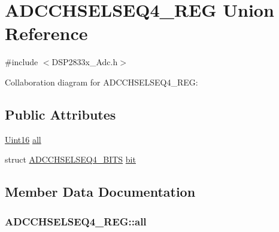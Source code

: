 \hypertarget{union_a_d_c_c_h_s_e_l_s_e_q4___r_e_g}{}\section{A\+D\+C\+C\+H\+S\+E\+L\+S\+E\+Q4\+\_\+\+R\+E\+G Union Reference}
\label{union_a_d_c_c_h_s_e_l_s_e_q4___r_e_g}


{\ttfamily \#include $<$D\+S\+P2833x\+\_\+\+Adc.\+h$>$}



Collaboration diagram for A\+D\+C\+C\+H\+S\+E\+L\+S\+E\+Q4\+\_\+\+R\+E\+G\+:
\subsection*{Public Attributes}
\begin{DoxyCompactItemize}
\item 
\hyperlink{_d_s_p2833x___device_8h_a59a9f6be4562c327cbfb4f7e8e18f08b}{Uint16} \hyperlink{union_a_d_c_c_h_s_e_l_s_e_q4___r_e_g_a1863a872aef8b5331636cfff9b10e40a}{all}
\item 
struct \hyperlink{struct_a_d_c_c_h_s_e_l_s_e_q4___b_i_t_s}{A\+D\+C\+C\+H\+S\+E\+L\+S\+E\+Q4\+\_\+\+B\+I\+T\+S} \hyperlink{union_a_d_c_c_h_s_e_l_s_e_q4___r_e_g_a3c932b9c01c8c20d08e05a337ecf8a9f}{bit}
\end{DoxyCompactItemize}


\subsection{Member Data Documentation}
\hypertarget{union_a_d_c_c_h_s_e_l_s_e_q4___r_e_g_a1863a872aef8b5331636cfff9b10e40a}{}
\subsubsection[{all}]{ A\+D\+C\+C\+H\+S\+E\+L\+S\+E\+Q4\+\_\+\+R\+E\+G\+::all}\label{union_a_d_c_c_h_s_e_l_s_e_q4___r_e_g_a1863a872aef8b5331636cfff9b10e40a}
\hypertarget{union_a_d_c_c_h_s_e_l_s_e_q4___r_e_g_a3c932b9c01c8c20d08e05a337ecf8a9f}{}

